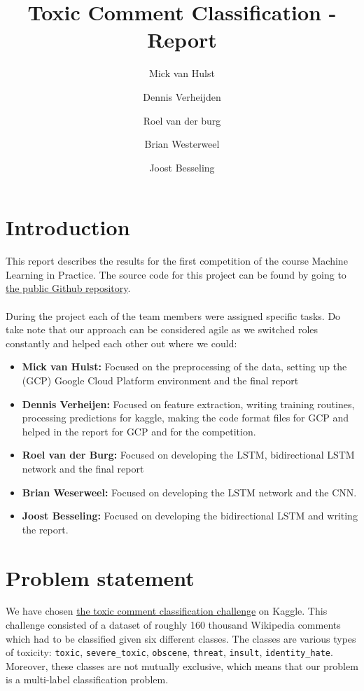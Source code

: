 \documentclass[10pt, a4paper]{article}
\title{Toxic Comment Classification - Report}
\author{Mick van Hulst \and Dennis Verheijden \and Roel van der burg \and Brian Westerweel \and Joost Besseling}
\begin{document}
	\maketitle
	
	
	\begin{multicols}{2}
	
	    \section{Introduction}
	    This report describes the results for the first competition of the course Machine Learning in Practice. The source code for this project can be found by going to \href{https://github.com/ScaleRunner/MLoB\#challenge}{the public Github repository}.
	    \\
	    \\
	    During the project each of the team members were assigned specific tasks. Do take note that our approach can be considered agile as we switched roles constantly and helped each other out where we could:
	    \begin{itemize}
	        \item \textbf{Mick van Hulst:} Focused on the preprocessing of the data, setting up the (GCP) Google Cloud Platform environment and the final report
	        \item \textbf{Dennis Verheijen:} Focused on feature extraction, writing training routines, processing predictions for kaggle, making the code format files for GCP and helped in the report for GCP and for the competition.
	        \item \textbf{Roel van der Burg:} Focused on developing the LSTM, bidirectional LSTM network and the final report
	        \item \textbf{Brian Weserweel:} Focused on developing the LSTM network and the CNN.
	        \item \textbf{Joost Besseling:} Focused on developing the bidirectional LSTM and writing the report.
	    \end{itemize}
		
		\section{Problem statement}
		We have chosen \href{https://www.kaggle.com/c/jigsaw-toxic-comment-classification-challenge/}{the toxic comment classification challenge} on Kaggle. This challenge consisted of a dataset of roughly 160 thousand Wikipedia comments which had to be classified given six different classes. The classes are various types of toxicity: \texttt{toxic}, \texttt{severe\_toxic}, \texttt{obscene}, \texttt{threat}, \texttt{insult}, \texttt{identity\_hate}. Moreover, these classes are not mutually exclusive, which means that our problem is a multi-label classification problem.
		

\end{multicols}
\end{document}
